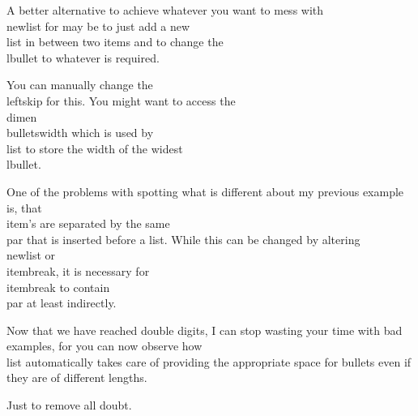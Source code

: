 {{  \item{A better alternative to achieve whatever you want to mess with {\cs\\newlist} for may be to just add a new {\cs\\list} in between two items and to change the {\cs\\lbullet} to whatever is required.}
  \item{You can manually change the {\cs\\leftskip} for this. You might want to access the {\cs\\dimen} {\cs\\bulletswidth} which is used by {\cs\\list} to store the width of the widest {\cs\\lbullet}.}
  {\advance\leftskip\bulletswidth{}}
  \item{One of the problems with spotting what is different about my previous example is, that {\cs\\item}'s are separated by the same {\cs\\par} that is inserted before a list. While this can be changed by altering {\cs\\newlist} or {\cs\\itembreak}, it is necessary for {\cs\\itembreak} to contain {\cs\\par} at least indirectly.}
  \item{Now that we have reached double digits, I can stop wasting your time with bad examples, for you can now observe how {\cs\\list} automatically takes care of providing the appropriate space for bullets even if they are of different lengths.}
  {\long\def\lbullet{$\circ\quad$}
  \item{Just to remove all doubt.}}}}
